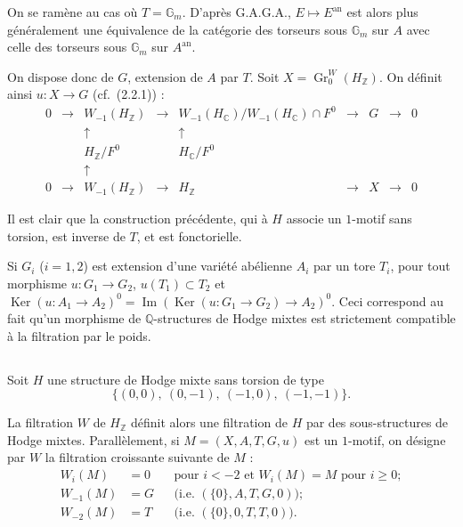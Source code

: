 \documentclass[12pt,a4paper]{amsart}
\theoremstyle{plain}
\theoremstyle{definition}
\theoremstyle{remark}
\DeclareMathOperator{\Ker}{Ker}
\DeclareMathOperator{\Ime}{Im}
\DeclareMathOperator{\Gr}{Gr}
\numberwithin{equation}{section}
\begin{document}
On se ramène au cas où $T=\mathbb{G}_m$. D'après G.A.G.A., $E\mapsto E^\mathrm{an}$ est alors plus généralement une équivalence de la catégorie des torseurs sous $\mathbb{G}_m$ sur $A$ avec celle des torseurs sous $\mathbb{G}_m$ sur $A^\mathrm{an}$.

On dispose donc de $G$, extension de $A$ par $T$. Soit $X=\Gr_0^W(H_\mathbb{Z})$. On définit ainsi $u:X\to G$ (cf.~(2.2.1)) :
\[
\begin{array}{ccccccccc}
0 & \longrightarrow & W_{-1}(H_\mathbb{Z}) & \longrightarrow & W_{-1}(H_\mathbb{C})/W_{-1}(H_\mathbb{C})\cap F^0 & \longrightarrow & G & \longrightarrow & 0 \\
 & & \uparrow & & \uparrow & & & & \\
 & & H_\mathbb{Z}/F^0 & & H_\mathbb{C}/F^0 & & & & \\
 & & \uparrow & & & & & & \\
0 & \longrightarrow & W_{-1}(H_\mathbb{Z}) & \longrightarrow & H_\mathbb{Z} & \longrightarrow & X & \longrightarrow & 0
\end{array}
\]

Il est clair que la construction précédente, qui à $H$ associe un $1$-motif sans torsion, est inverse de $T$, et est fonctorielle.

Si $G_i$ ($i=1,2$) est extension d'une variété abélienne $A_i$ par un tore $T_i$, pour tout morphisme $u:G_1\to G_2$, $u(T_1)\subset T_2$ et $\Ker(u:A_1\to A_2)^0=\Ime(\Ker(u:G_1\to G_2)\to A_2)^0$. Ceci correspond au fait qu'un morphisme de $\mathbb{Q}$-structures de Hodge mixtes est strictement compatible à la filtration par le poids.

\subsection{}\label{10.1.4}
Soit $H$ une structure de Hodge mixte sans torsion de type
\[
\{(0,0),\ (0,-1),\ (-1,0),\ (-1,-1)\}.
\]

La filtration $W$ de $H_\mathbb{Z}$ définit alors une filtration de $H$ par des sous-structures de Hodge mixtes. Parallèlement, si $M=(X,A,T,G,u)$ est un $1$-motif, on désigne par $W$ la filtration croissante suivante de $M$ :
\begin{align*}
W_i(M) &= 0 && \text{pour } i<-2 \text{ et } W_i(M)=M \text{ pour } i\geq 0;\\
W_{-1}(M) &= G && \text{(i.e. } (\{0\},A,T,G,0));\\
W_{-2}(M) &= T && \text{(i.e. } (\{0\},0,T,T,0)).
\end{align*}
\end{document}

